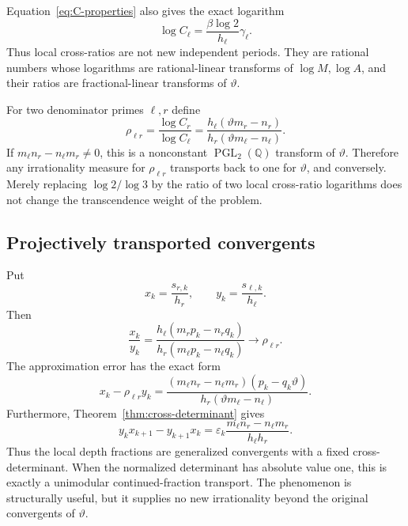 \documentclass[11pt,oneside]{article}
\theoremstyle{definition}
\theoremstyle{remark}
\newcommand{\Q}{\mathbb Q}
\newcommand{\thetaq}{\vartheta}
\newcommand{\eps}{\varepsilon}
\newcommand{\PGL}{\operatorname{PGL}}
\begin{document}
Equation~\eqref{eq:C-properties} also gives the exact logarithm
\begin{equation}
 \log C_\ell
 =\frac{\beta\log2}{h_\ell}\gamma_\ell.
 \label{eq:logC}
\end{equation}
Thus local cross-ratios are not new independent periods.  They are rational numbers whose
logarithms are rational-linear transforms of $\log M,\log A$, and their ratios are
fractional-linear transforms of $\thetaq$.

For two denominator primes $\ell,r$ define
\begin{equation}
 \rho_{\ell r}
 =\frac{\log C_r}{\log C_\ell}
 =\frac{h_\ell(\thetaq m_r-n_r)}
        {h_r(\thetaq m_\ell-n_\ell)}.
 \label{eq:rho}
\end{equation}
If $m_\ell n_r-n_\ell m_r\ne0$, this is a nonconstant $\PGL_2(\Q)$ transform of $\thetaq$.
Therefore any irrationality measure for $\rho_{\ell r}$ transports back to one for
$\thetaq$, and conversely.  Merely replacing $\log2/\log3$ by the ratio of two local
cross-ratio logarithms does not change the transcendence weight of the problem.

\subsection{Projectively transported convergents}

Put
\begin{equation}
 x_k=\frac{s_{r,k}}{h_r},
 \qquad y_k=\frac{s_{\ell,k}}{h_\ell}.
 \label{eq:xy-depth}
\end{equation}
Then
\begin{equation}
 \frac{x_k}{y_k}
 =\frac{h_\ell(m_rp_k-n_rq_k)}
        {h_r(m_\ell p_k-n_\ell q_k)}
 \longrightarrow \rho_{\ell r}.
 \label{eq:mobius-convergents}
\end{equation}
The approximation error has the exact form
\begin{equation}
 x_k-\rho_{\ell r}y_k
 =\frac{(m_\ell n_r-n_\ell m_r)(p_k-q_k\thetaq)}
        {h_r(\thetaq m_\ell-n_\ell)}.
 \label{eq:transported-error}
\end{equation}
Furthermore, Theorem~\ref{thm:cross-determinant} gives
\begin{equation}
 y_kx_{k+1}-y_{k+1}x_k
 =\eps_k\frac{m_\ell n_r-n_\ell m_r}{h_\ell h_r}.
 \label{eq:transported-det}
\end{equation}
Thus the local depth fractions are generalized convergents with a fixed cross-determinant.
When the normalized determinant has absolute value one, this is exactly a unimodular
continued-fraction transport.  The phenomenon is structurally useful, but it supplies no
new irrationality beyond the original convergents of $\thetaq$.
\end{document}
